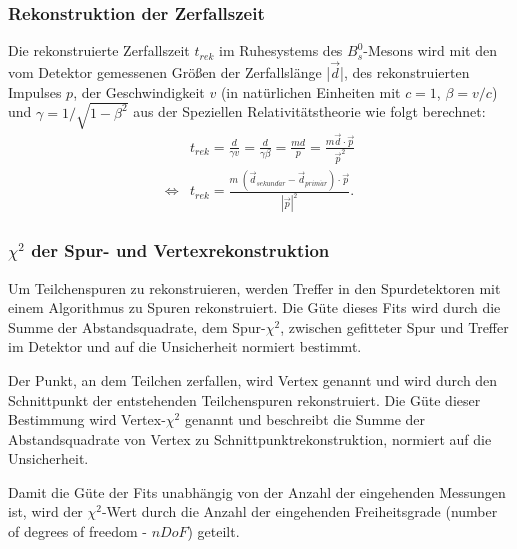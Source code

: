\documentclass{article}
\begin{document}
\subsubsection{Rekonstruktion der Zerfallszeit}
Die rekonstruierte Zerfallszeit $t_{rek}$ im Ruhesystems des $B_s^0$-Mesons wird mit den vom Detektor gemessenen Größen der Zerfallslänge |$\vec{d}$|, des rekonstruierten Impulses $p$, der Geschwindigkeit $v$ (in natürlichen Einheiten mit $c=1$, $\beta=v/c$) und $\gamma=1/\sqrt{1-\beta^2}$ aus der Speziellen Relativitätstheorie wie folgt berechnet:
\label{ch:bsphiphi}
\begin{align*}
&t_{rek}=\frac{d}{\gamma v}=\frac{d}{\gamma \beta}=\frac{md}{p}=\frac{m\vec{d}\cdot \vec{p}}{\vec{p}^2}
\\ \Leftrightarrow&t_{rek}=\frac{m \; (\vec{d}_{sekund\ddot{a}r}-\vec{d}_{prim\ddot{a}r}) \cdot \vec{p}}{|\vec{p}|^2}.
\end{align*}

\subsubsection{$\chi^2$ der Spur- und Vertexrekonstruktion}
Um Teilchenspuren zu rekonstruieren, werden Treffer in den Spurdetektoren mit einem Algorithmus zu Spuren rekonstruiert. Die Güte dieses Fits wird durch die Summe der Abstandsquadrate, dem Spur-$\chi^2$, zwischen gefitteter Spur und Treffer im Detektor und auf die Unsicherheit normiert bestimmt. %

Der Punkt, an dem Teilchen zerfallen, wird Vertex genannt und wird durch den Schnittpunkt der entstehenden Teilchenspuren rekonstruiert. Die Güte dieser Bestimmung wird Vertex-$\chi^2$ genannt und beschreibt die Summe der Abstandsquadrate von Vertex zu Schnittpunktrekonstruktion, normiert auf die Unsicherheit. 

Damit die Güte der Fits unabhängig von der Anzahl der eingehenden Messungen ist, wird der $\chi^2$-Wert durch die Anzahl der eingehenden Freiheitsgrade (number of degrees of freedom - $nDoF$) geteilt. 
\end{document}
